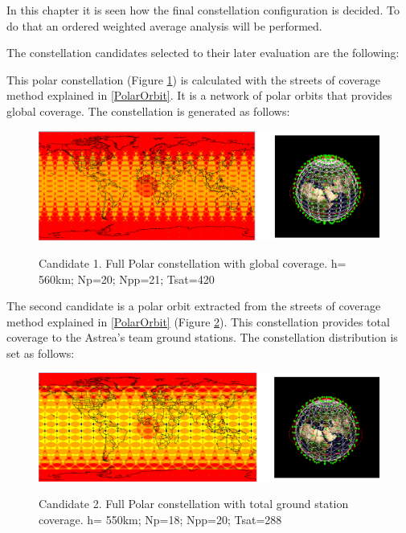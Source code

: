 In this chapter it is seen how the final constellation configuration is decided. To do that an ordered weighted average analysis will be performed.

The constellation candidates selected to their later evaluation are the following:

This polar constellation (Figure \ref{fig:Candidate1}) is calculated with the streets of coverage method explained in \ref{PolarOrbit}. It is a network of polar orbits that provides global coverage. The constellation is generated as follows:

\begin{figure}[H] %
	\centering
	\includegraphics[width=1\textwidth]{Candidate1.png}\\
	\caption[Candidate 1]{Candidate 1. Full Polar constellation with global coverage.
			 h= 560km; Np=20; Npp=21; Tsat=420 }
	\label{fig:Candidate1}
\end{figure}

The second candidate is a polar orbit extracted from the streets of coverage method explained in \ref{PolarOrbit} (Figure \ref{fig:Candidate2}). This constellation provides total coverage to the Astrea's team ground stations. The constellation distribution is set as follows:

\begin{figure}[H]%
	\centering
	\includegraphics[width=1\textwidth]{Candidate2.png}\\
	\caption[Candidate 2]{Candidate 2. Full Polar constellation with total ground station coverage.
			 h= 550km; Np=18; Npp=20; Tsat=288 }
	\label{fig:Candidate2}
\end{figure}

